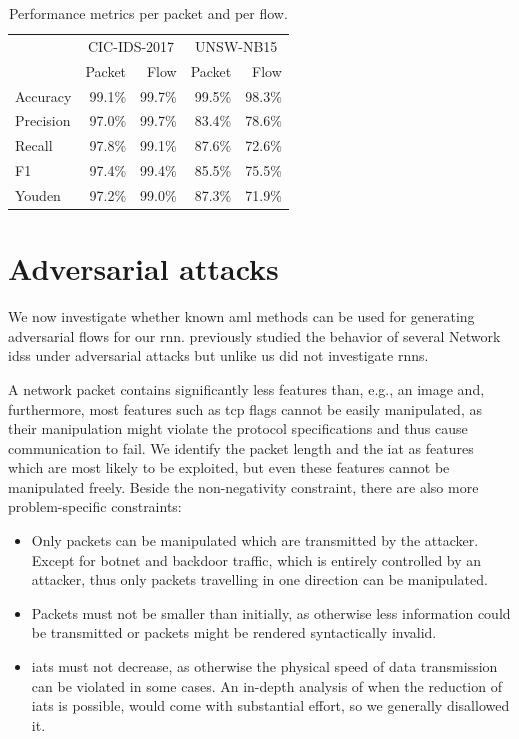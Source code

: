 \documentclass[conference]{IEEEtran}
\begin{document}
\begin{table}
\caption{Performance metrics per packet and per flow.} \label{tab:performance_results}
\centering
\begin{tabular}{l r r r r} \toprule
& \multicolumn{2}{c}{CIC-IDS-2017} & \multicolumn{2}{c}{UNSW-NB15} \\
	&	Packet	&	Flow	&	Packet	&	Flow	\\	\midrule
Accuracy	&	99.1\%	&	99.7\%	&	99.5\%	&	98.3\%	\\
Precision	&	97.0\%	&	99.7\%	&	83.4\%	&	78.6\%	\\
Recall	&	97.8\%	&	99.1\%	&	87.6\%	&	72.6\%	\\
F1	&	97.4\%	&	99.4\%	&	85.5\%	&	75.5\%	\\
Youden	&	97.2\%	&	99.0\%	&	87.3\%	&	71.9\%	\\
\bottomrule
\end{tabular}
\end{table}

\section{Adversarial attacks}
\label{sec:adv}
We now investigate whether known \gls{aml} methods can be used for generating adversarial flows for our \gls{rnn}. \cite{hashemi_towards_2019} previously studied the behavior of several Network \glspl{ids} under adversarial attacks but unlike us did not investigate \glspl{rnn}.

A network packet contains significantly less features than, e.g., an image and, furthermore, most features such as \gls{tcp} flags cannot be easily manipulated, as their manipulation might violate the protocol specifications and thus cause communication to fail. We identify the packet length and the \gls{iat} as features which are most likely to be exploited, but even these features cannot be manipulated freely. Beside the non-negativity constraint,  there are also more problem-specific constraints:
\begin{itemize}[topsep=0pt,wide,labelwidth=!,labelindent=0pt]
\item Only packets can be manipulated which are transmitted by the attacker.
Except for botnet and backdoor traffic, which is entirely controlled by an attacker, thus only packets travelling in one direction can be manipulated.
\item Packets must not be smaller than initially, as otherwise less information could be transmitted or packets might be rendered syntactically invalid.
\item \glspl{iat} must not decrease, as otherwise the physical speed of data transmission can be violated in some cases. An in-depth analysis of when the reduction of \glspl{iat} is possible, would come with substantial effort, so we generally disallowed it.
\end{itemize}
\end{document}
